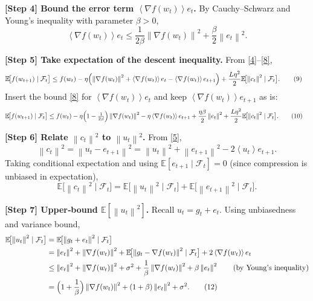 \documentclass{article}
\newcommand{\E}{\mathbb{E}}
\newcommand{\norm}[1]{\left\|#1\right\|}
\newcommand{\inner}[1]{\left\langle#1\right\rangle}
\begin{document}
\noindent\textbf{[Step 4] Bound the error term $\inner{\nabla f(w_t)}{e_t}$.}  
By Cauchy–Schwarz and Young’s inequality with parameter $\beta>0$,
\[
\inner{\nabla f(w_t)}{e_t}\le \frac{1}{2\beta}\norm{\nabla f(w_t)}^2
                         +\frac{\beta}{2}\norm{e_t}^2 .
\tag{8}
\]

\noindent\textbf{[Step 5] Take expectation of the descent inequality.}  
From \eqref{4}–\eqref{8},
\begin{align}
\E\!\bigl[f(w_{t+1})\mid\mathcal{F}_t\bigr]
&\le f(w_t)-\eta\Bigl(\norm{\nabla f(w_t)}^2
      +\inner{\nabla f(w_t)}{e_t}
      -\inner{\nabla f(w_t)}{e_{t+1}}\Bigr)
   +\frac{L\eta^2}{2}\E\!\bigl[\norm{c_t}^2\mid\mathcal{F}_t\bigr] .
\tag{9}
\end{align}
Insert the bound \eqref{8} for $\inner{\nabla f(w_t)}{e_t}$ and keep $\inner{\nabla f(w_t)}{e_{t+1}}$ as is:
\begin{align}
\E\!\bigl[f(w_{t+1})\mid\mathcal{F}_t\bigr]
&\le f(w_t)-\eta\Bigl(1-\tfrac{1}{2\beta}\Bigr)\norm{\nabla f(w_t)}^2
      -\eta\inner{\nabla f(w_t)}{e_{t+1}}
      +\frac{\eta\beta}{2}\norm{e_t}^2
      +\frac{L\eta^2}{2}\E\!\bigl[\norm{c_t}^2\mid\mathcal{F}_t\bigr] .
\tag{10}
\end{align}

\noindent\textbf{[Step 6] Relate $\norm{c_t}^2$ to $\norm{u_t}^2$.}  
From \eqref{5},
\[
\norm{c_t}^2 = \norm{u_t-e_{t+1}}^2
            = \norm{u_t}^2 + \norm{e_{t+1}}^2 - 2\inner{u_t}{e_{t+1}} .
\]
Taking conditional expectation and using $\E[e_{t+1}\mid\mathcal{F}_t]=0$ (since compression is unbiased in expectation),
\[
\E\!\bigl[\norm{c_t}^2\mid\mathcal{F}_t\bigr]
= \E\!\bigl[\norm{u_t}^2\mid\mathcal{F}_t\bigr]
  +\E\!\bigl[\norm{e_{t+1}}^2\mid\mathcal{F}_t\bigr] .
\tag{11}
\]

\noindent\textbf{[Step 7] Upper‑bound $\E[\norm{u_t}^2]$.}  
Recall $u_t=g_t+e_t$. Using unbiasedness and variance bound,
\begin{align}
\E\!\bigl[\norm{u_t}^2\mid\mathcal{F}_t\bigr]
&= \E\!\bigl[\norm{g_t+e_t}^2\mid\mathcal{F}_t\bigr] \nonumber\\
&= \norm{e_t}^2 + \norm{\nabla f(w_t)}^2
   + \E\!\bigl[\norm{g_t-\nabla f(w_t)}^2\mid\mathcal{F}_t\bigr]
   + 2\inner{\nabla f(w_t)}{e_t} \nonumber\\
&\le \norm{e_t}^2 + \norm{\nabla f(w_t)}^2 + \sigma^2
   + \frac{1}{\beta}\norm{\nabla f(w_t)}^2
   + \beta \norm{e_t}^2 \qquad\text{(by Young's inequality)} \nonumber\\
&= \Bigl(1+\frac{1}{\beta}\Bigr)\norm{\nabla f(w_t)}^2
   + (1+\beta)\norm{e_t}^2 + \sigma^2 .
\tag{12}
\end{align}
\end{document}
